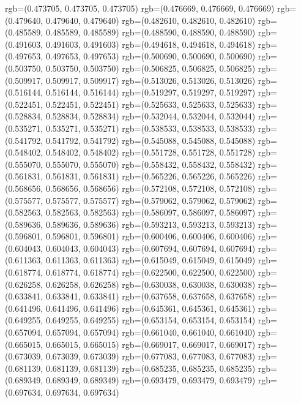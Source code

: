 {{{					rgb=(0.473705, 0.473705, 0.473705)
					rgb=(0.476669, 0.476669, 0.476669)
					rgb=(0.479640, 0.479640, 0.479640)
					rgb=(0.482610, 0.482610, 0.482610)
					rgb=(0.485589, 0.485589, 0.485589)
					rgb=(0.488590, 0.488590, 0.488590)
					rgb=(0.491603, 0.491603, 0.491603)
					rgb=(0.494618, 0.494618, 0.494618)
					rgb=(0.497653, 0.497653, 0.497653)
					rgb=(0.500690, 0.500690, 0.500690)
					rgb=(0.503750, 0.503750, 0.503750)
					rgb=(0.506825, 0.506825, 0.506825)
					rgb=(0.509917, 0.509917, 0.509917)
					rgb=(0.513026, 0.513026, 0.513026)
					rgb=(0.516144, 0.516144, 0.516144)
					rgb=(0.519297, 0.519297, 0.519297)
					rgb=(0.522451, 0.522451, 0.522451)
					rgb=(0.525633, 0.525633, 0.525633)
					rgb=(0.528834, 0.528834, 0.528834)
					rgb=(0.532044, 0.532044, 0.532044)
					rgb=(0.535271, 0.535271, 0.535271)
					rgb=(0.538533, 0.538533, 0.538533)
					rgb=(0.541792, 0.541792, 0.541792)
					rgb=(0.545088, 0.545088, 0.545088)
					rgb=(0.548402, 0.548402, 0.548402)
					rgb=(0.551728, 0.551728, 0.551728)
					rgb=(0.555070, 0.555070, 0.555070)
					rgb=(0.558432, 0.558432, 0.558432)
					rgb=(0.561831, 0.561831, 0.561831)
					rgb=(0.565226, 0.565226, 0.565226)
					rgb=(0.568656, 0.568656, 0.568656)
					rgb=(0.572108, 0.572108, 0.572108)
					rgb=(0.575577, 0.575577, 0.575577)
					rgb=(0.579062, 0.579062, 0.579062)
					rgb=(0.582563, 0.582563, 0.582563)
					rgb=(0.586097, 0.586097, 0.586097)
					rgb=(0.589636, 0.589636, 0.589636)
					rgb=(0.593213, 0.593213, 0.593213)
					rgb=(0.596801, 0.596801, 0.596801)
					rgb=(0.600406, 0.600406, 0.600406)
					rgb=(0.604043, 0.604043, 0.604043)
					rgb=(0.607694, 0.607694, 0.607694)
					rgb=(0.611363, 0.611363, 0.611363)
					rgb=(0.615049, 0.615049, 0.615049)
					rgb=(0.618774, 0.618774, 0.618774)
					rgb=(0.622500, 0.622500, 0.622500)
					rgb=(0.626258, 0.626258, 0.626258)
					rgb=(0.630038, 0.630038, 0.630038)
					rgb=(0.633841, 0.633841, 0.633841)
					rgb=(0.637658, 0.637658, 0.637658)
					rgb=(0.641496, 0.641496, 0.641496)
					rgb=(0.645361, 0.645361, 0.645361)
					rgb=(0.649255, 0.649255, 0.649255)
					rgb=(0.653154, 0.653154, 0.653154)
					rgb=(0.657094, 0.657094, 0.657094)
					rgb=(0.661040, 0.661040, 0.661040)
					rgb=(0.665015, 0.665015, 0.665015)
					rgb=(0.669017, 0.669017, 0.669017)
					rgb=(0.673039, 0.673039, 0.673039)
					rgb=(0.677083, 0.677083, 0.677083)
					rgb=(0.681139, 0.681139, 0.681139)
					rgb=(0.685235, 0.685235, 0.685235)
					rgb=(0.689349, 0.689349, 0.689349)
					rgb=(0.693479, 0.693479, 0.693479)
					rgb=(0.697634, 0.697634, 0.697634)
}}}
